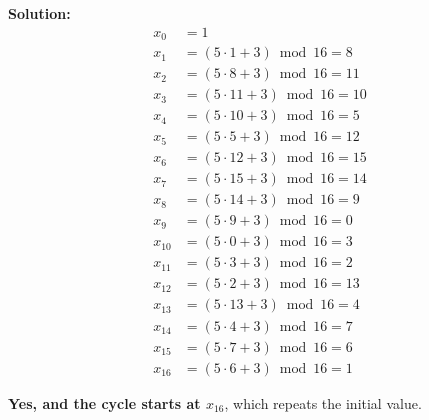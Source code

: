 \documentclass[legalpaper,11pt,extrafontsizes,oneside,openany,x11names]{memoir}
\begin{document}
\begin{enumerate}
    \textbf{Solution:}
\begin{align*}
x_0 & = 1 \\
x_1 & = (5 \cdot 1 + 3) \bmod 16 = 8 \\
x_2 & = (5 \cdot 8 + 3) \bmod 16 = 11 \\
x_3 & = (5 \cdot 11 + 3) \bmod 16 = 10 \\
x_4 & = (5 \cdot 10 + 3) \bmod 16 = 5 \\
x_5 & = (5 \cdot 5 + 3) \bmod 16 = 12 \\
x_6 & = (5 \cdot 12 + 3) \bmod 16 = 15 \\
x_7 & = (5 \cdot 15 + 3) \bmod 16 = 14 \\
x_8 & = (5 \cdot 14 + 3) \bmod 16 = 9 \\
x_9 & = (5 \cdot 9 + 3) \bmod 16 = 0 \\
x_{10} & = (5 \cdot 0 + 3) \bmod 16 = 3 \\
x_{11} & = (5 \cdot 3 + 3) \bmod 16 = 2 \\
x_{12} & = (5 \cdot 2 + 3) \bmod 16 = 13 \\
x_{13} & = (5 \cdot 13 + 3) \bmod 16 = 4 \\
x_{14} & = (5 \cdot 4 + 3) \bmod 16 = 7 \\
x_{15} & = (5 \cdot 7 + 3) \bmod 16 = 6 \\
x_{16} & = \boxed{(5 \cdot 6 + 3) \bmod 16 = 1}
\end{align*}

\textbf{Yes, and the cycle starts at $x_{16}$}, which repeats the initial value.


\end{enumerate}
\end{document}

